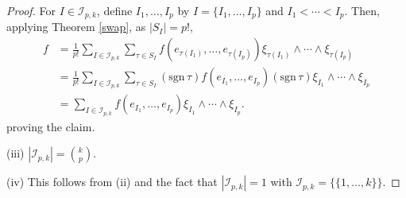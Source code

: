 \documentclass{article}
\newcommand{\sgn}{\mathrm{sgn}\,}
\theoremstyle{definition}
\theoremstyle{definition}
\begin{document}
\begin{proof}
For $I \in \mathscr{I}_{p,k}$, define $I_1,\ldots,I_p$ by $I=\{I_1,\ldots,I_p\}$ and
$I_1<\cdots<I_p$. 
Then, applying Theorem \ref{swap}, as $|S_I|=p!$,
\begin{align*}
f&= \frac{1}{p!} \sum_{I \in \mathscr{I}_{p,k}} \sum_{\tau \in S_I} f(e_{\tau(I_1)},\ldots,e_{\tau(I_p)}) \xi_{\tau(I_1)} \wedge \cdots \wedge \xi_{\tau(I_p)}\\
&=\frac{1}{p!} \sum_{I \in \mathscr{I}_{p,k}} \sum_{\tau \in S_I} (\sgn \tau) f(e_{I_1},\ldots,e_{I_p}) (\sgn \tau) \xi_{I_1} \wedge \cdots \wedge \xi_{I_p}\\
&=\sum_{I \in \mathscr{I}_{p,k}} f(e_{I_1},\ldots,e_{I_p}) \xi_{I_1} \wedge \cdots \wedge \xi_{I_p}.
\end{align*}
proving the claim.

(iii) $|\mathscr{I}_{p,k}| = \binom{k}{p}$.

(iv) This follows from (ii) and the fact that $|\mathscr{I}_{p,k}|=1$ with $\mathscr{I}_{p,k} = \{\{1,\ldots,k\}\}$.
\end{proof}



\end{document}
